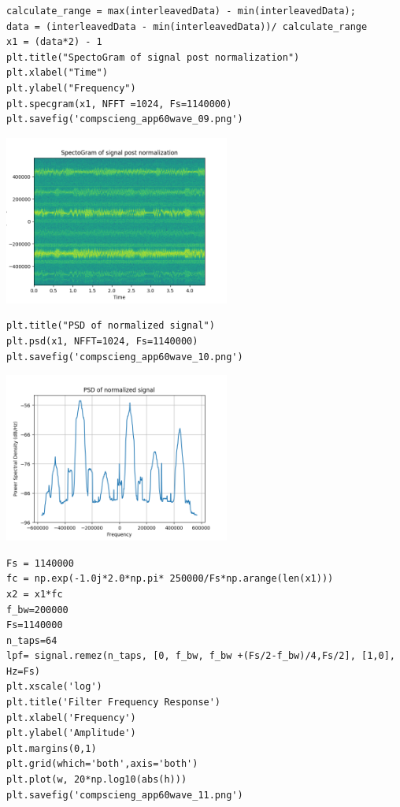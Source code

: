 \documentclass[12pt,fleqn]{article}\usepackage{../../common}
\begin{document}
\begin{verbatim}
calculate_range = max(interleavedData) - min(interleavedData);
data = (interleavedData - min(interleavedData))/ calculate_range
x1 = (data*2) - 1
plt.title("SpectoGram of signal post normalization")
plt.xlabel("Time")
plt.ylabel("Frequency")
plt.specgram(x1, NFFT =1024, Fs=1140000)
plt.savefig('compscieng_app60wave_09.png')
\end{verbatim}

\includegraphics[width=20em]{compscieng_app60wave_09.png}

\begin{verbatim}
plt.title("PSD of normalized signal")
plt.psd(x1, NFFT=1024, Fs=1140000)
plt.savefig('compscieng_app60wave_10.png')
\end{verbatim}

\includegraphics[width=20em]{compscieng_app60wave_10.png}

\begin{verbatim}
Fs = 1140000
fc = np.exp(-1.0j*2.0*np.pi* 250000/Fs*np.arange(len(x1)))
x2 = x1*fc
f_bw=200000
Fs=1140000
n_taps=64
lpf= signal.remez(n_taps, [0, f_bw, f_bw +(Fs/2-f_bw)/4,Fs/2], [1,0], Hz=Fs)
plt.xscale('log')
plt.title('Filter Frequency Response')
plt.xlabel('Frequency')
plt.ylabel('Amplitude')
plt.margins(0,1)
plt.grid(which='both',axis='both')
plt.plot(w, 20*np.log10(abs(h)))
plt.savefig('compscieng_app60wave_11.png')
\end{verbatim}
\end{document}
